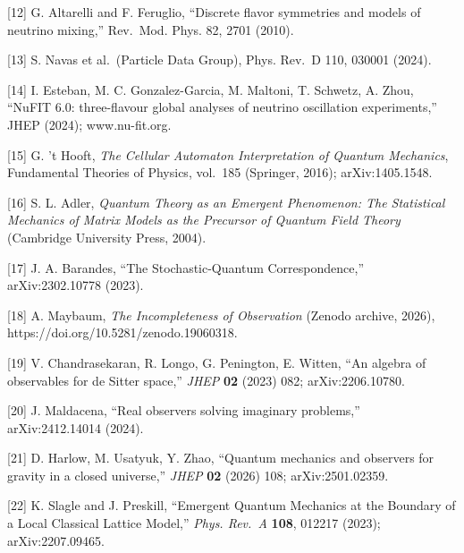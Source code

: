 \documentclass[
  11pt,
  letterpaper,
]{article}
\begin{document}
{[}12{]} G. Altarelli and F. Feruglio, ``Discrete flavor symmetries and
models of neutrino mixing,'' Rev.~Mod. Phys. 82, 2701 (2010).

{[}13{]} S. Navas et al.~(Particle Data Group), Phys. Rev.~D 110, 030001
(2024).

{[}14{]} I. Esteban, M. C. Gonzalez-Garcia, M. Maltoni, T. Schwetz, A.
Zhou, ``NuFIT 6.0: three-flavour global analyses of neutrino oscillation
experiments,'' JHEP (2024); www.nu-fit.org.

{[}15{]} G. 't Hooft, \emph{The Cellular Automaton Interpretation of
Quantum Mechanics}, Fundamental Theories of Physics, vol.~185 (Springer,
2016); arXiv:1405.1548.

{[}16{]} S. L. Adler, \emph{Quantum Theory as an Emergent Phenomenon:
The Statistical Mechanics of Matrix Models as the Precursor of Quantum
Field Theory} (Cambridge University Press, 2004).

{[}17{]} J. A. Barandes, ``The Stochastic-Quantum Correspondence,''
arXiv:2302.10778 (2023).

{[}18{]} A. Maybaum, \emph{The Incompleteness of Observation} (Zenodo
archive, 2026), https://doi.org/10.5281/zenodo.19060318.

{[}19{]} V. Chandrasekaran, R. Longo, G. Penington, E. Witten, ``An
algebra of observables for de Sitter space,'' \emph{JHEP} \textbf{02}
(2023) 082; arXiv:2206.10780.

{[}20{]} J. Maldacena, ``Real observers solving imaginary problems,''
arXiv:2412.14014 (2024).

{[}21{]} D. Harlow, M. Usatyuk, Y. Zhao, ``Quantum mechanics and
observers for gravity in a closed universe,'' \emph{JHEP} \textbf{02}
(2026) 108; arXiv:2501.02359.

{[}22{]} K. Slagle and J. Preskill, ``Emergent Quantum Mechanics at the
Boundary of a Local Classical Lattice Model,'' \emph{Phys. Rev.~A}
\textbf{108}, 012217 (2023); arXiv:2207.09465.
\end{document}
